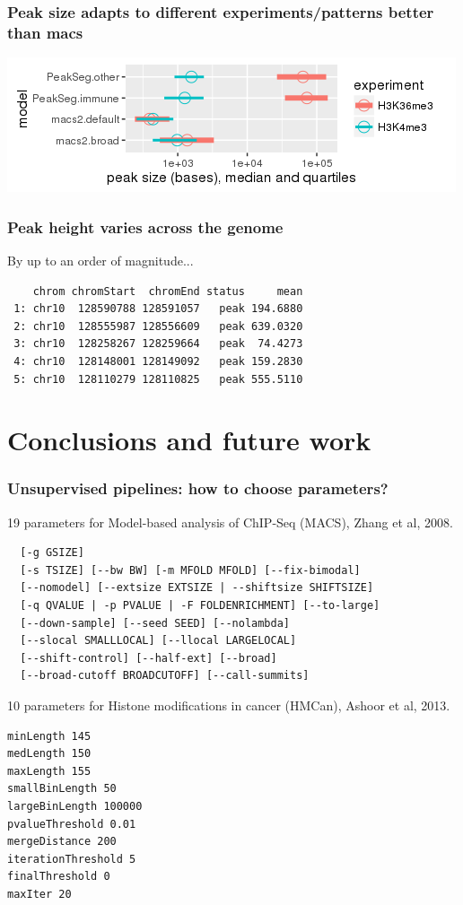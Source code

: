 \documentclass{beamer}
\begin{document}
\begin{frame}
  \frametitle{Peak size adapts to different experiments/patterns
    better than macs}
  
  \includegraphics[width=\textwidth]{figure-PeakSeg-macs-peak-size-comparison}

\end{frame}

\begin{frame}[fragile]
  \frametitle{Peak height varies across the genome}

By up to an order of magnitude...
  
\begin{verbatim}
    chrom chromStart  chromEnd status     mean
 1: chr10  128590788 128591057   peak 194.6880
 2: chr10  128555987 128556609   peak 639.0320
 3: chr10  128258267 128259664   peak  74.4273
 4: chr10  128148001 128149092   peak 159.2830
 5: chr10  128110279 128110825   peak 555.5110
\end{verbatim}

\end{frame}

\section{Conclusions and future work}

\begin{frame}[fragile]
  \frametitle{Unsupervised pipelines: how to choose parameters?}
\scriptsize
19 parameters for Model-based analysis of ChIP-Seq (MACS), Zhang et al, 2008.
\begin{verbatim}
  [-g GSIZE]
  [-s TSIZE] [--bw BW] [-m MFOLD MFOLD] [--fix-bimodal]
  [--nomodel] [--extsize EXTSIZE | --shiftsize SHIFTSIZE]
  [-q QVALUE | -p PVALUE | -F FOLDENRICHMENT] [--to-large]
  [--down-sample] [--seed SEED] [--nolambda]
  [--slocal SMALLLOCAL] [--llocal LARGELOCAL]
  [--shift-control] [--half-ext] [--broad]
  [--broad-cutoff BROADCUTOFF] [--call-summits]
\end{verbatim}
10 parameters for Histone modifications in cancer (HMCan),
Ashoor et al, 2013.
\begin{verbatim}
minLength 145
medLength 150
maxLength 155
smallBinLength 50
largeBinLength 100000
pvalueThreshold 0.01
mergeDistance 200
iterationThreshold 5
finalThreshold 0
maxIter 20
\end{verbatim}
\end{frame}
\end{document}
